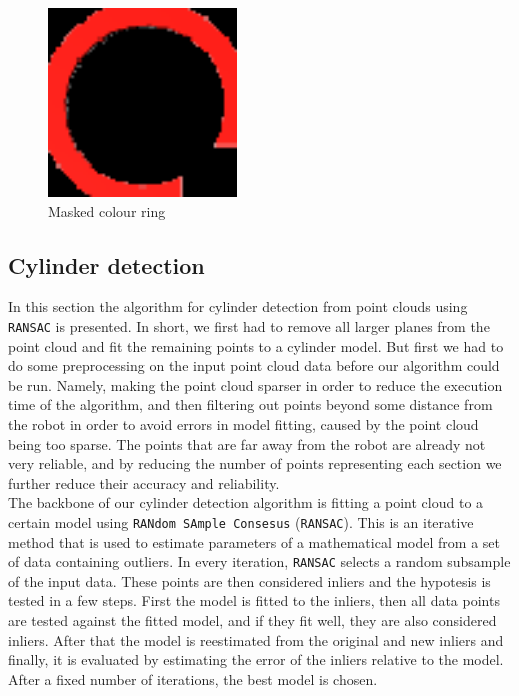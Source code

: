 \documentclass[12pt,a4paper]{article}
\begin{document}
	\begin{figure}[h]
		\centering
		\includegraphics[height=5cm]{images/ring_detection_colour}
		\caption{Masked colour ring}
		\label{fig:masked_colour_ring}
	\end{figure}
		
	\subsection{Cylinder detection}
	In this section the algorithm for cylinder detection from point clouds using \texttt{RANSAC} is presented. In short, we first had to remove all larger planes from the point cloud and fit the remaining points to a cylinder model. But first we had to do some preprocessing on the input point cloud data before our algorithm could be run. Namely, making the point cloud sparser in order to reduce the execution time of the algorithm, and then filtering out points beyond some distance from the robot in order to avoid errors in model fitting, caused by the point cloud being too sparse. The points that are far away from the robot are already not very reliable, and by reducing the number of points representing each section we further reduce their accuracy and reliability. \\

	The backbone of our cylinder detection algorithm is fitting a point cloud to a certain model using \texttt{RANdom SAmple Consesus} (\texttt{RANSAC}). This is an iterative method that is used to estimate parameters of a mathematical model from a set of data containing outliers. In every iteration, \texttt{RANSAC} selects a random subsample of the input data. These points are then considered inliers and the hypotesis is tested in a few steps. First the model is fitted to the inliers, then all data points are tested against the fitted model, and if they fit well, they are also considered inliers. After that the model is reestimated from the original and new inliers and finally, it is evaluated by estimating the error of the inliers relative to the model. After a fixed number of iterations, the best model is chosen. \\
	
\end{document}
